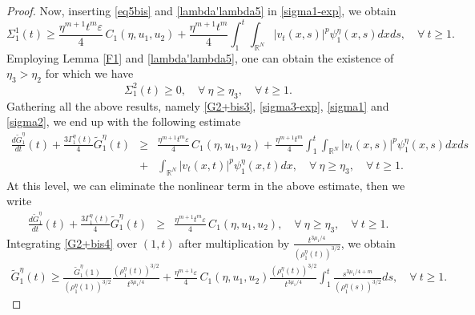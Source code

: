 \documentclass[12pt,leqno]{amsart}
\numberwithin{equation}{section}
\theoremstyle{remark}
\def\R{{\mathbb{R}}}
\def\d{\displaystyle}
\def\e{{\varepsilon}}
\begin{document}
\begin{proof}
Now, inserting  \eqref{eq5bis} and \eqref{lambda'lambda5} in \eqref{sigma1-exp}, we obtain 
\begin{equation}\label{sigma1}
\d \Sigma_1^1(t) \ge  \frac{\eta^{m+1} t^{m} \e}{4} \, C_1(\eta, u_1,u_2)+\frac{\eta^{m+1} t^{m}}{4}\int_{1}^t \int_{\R^N}|v_t(x,s)|^p\psi_1^{\eta}(x,s)dx ds, \quad \forall \ t \ge 1. 
\end{equation}
Employing Lemma \ref{F1} and \eqref{lambda'lambda5}, one can obtain the existence of  $ \eta_3>\eta_2$ for which we have
\begin{equation}\label{sigma2}
\d \Sigma_1^2(t) \ge 0, \quad \forall \ \eta \ge  \eta_3, \quad \forall \ t \ge 1. 
\end{equation}
Gathering all the above results, namely \eqref{G2+bis3}, \eqref{sigma3-exp}, \eqref{sigma1} and \eqref{sigma2}, we end up with the following estimate
\begin{equation}\label{G2+bis41}
\begin{array}{rcl}
\d \frac{d \tilde{G}^{\eta}_1}{dt}(t)+\frac{3\Gamma_1^{\eta}(t)}{4}\tilde{G}^{\eta}_1(t) &\ge& \d \frac{\eta^{m+1} t^{m} \e}{4} \, C_1(\eta, u_1,u_2)+\frac{\eta^{m+1} t^{m}}{4}\int_{1}^t \int_{\R^N}|v_t(x,s)|^p\psi_1^{\eta}(x,s)dx ds \\ &+&\d \int_{\R^N}|v_t(x,t)|^p\psi_1^{\eta}(x,t) dx, \quad \forall \ \eta \ge  \eta_3, \quad \forall \ t \ge 1. 
\end{array}
\end{equation}
At this level, we can eliminate  the nonlinear term in the above estimate,  then we write 
\begin{equation}\label{G2+bis4}
\begin{array}{rcl}
\d \frac{d \tilde{G}^{\eta}_1}{dt}(t)+\frac{3\Gamma_1^{\eta}(t)}{4}\tilde{G}^{\eta}_1(t) &\ge& \d \frac{\eta^{m+1} t^{m} \e}{4} \, C_1(\eta, u_1,u_2), \quad \forall \ \eta \ge  \eta_3, \quad \forall \ t \ge 1. 
\end{array}
\end{equation}
Integrating \eqref{G2+bis4} over $(1,t)$ after multiplication by $\d \frac{t^{3\mu_1/4}}{\left(\rho^{\eta}_1(t)\right)^{3/2}}$, we obtain
\begin{align}\label{est-G111-new}
 \tilde{G}^{\eta}_1(t)
\ge \frac{\tilde{G}^{\eta}_1(1)}{\left(\rho^{\eta}_1(1)\right)^{3/2}}\frac{\left(\rho^{\eta}_1(t)\right)^{3/2}}{t^{3\mu_1/4}}+\frac{\eta^{m+1} \e}{4} \, C_1(\eta, u_1,u_2)\frac{\left(\rho^{\eta}_1(t)\right)^{3/2}}{t^{3\mu_1/4}}
\int_{1}^t\frac{s^{3\mu_1/4+m}}{\left(\rho^{\eta}_1(s)\right)^{3/2}}ds, \quad \forall \ t  \ge  1. 

\end{align}
\end{proof}
\end{document}
